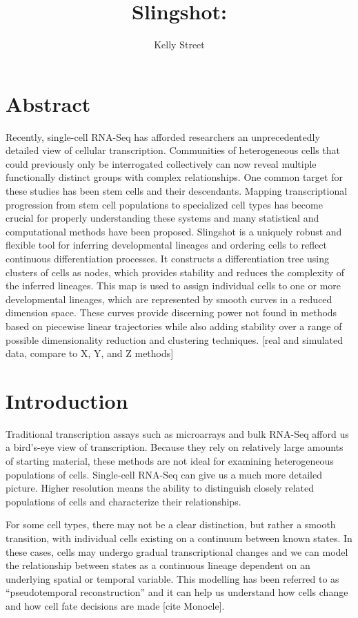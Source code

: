\documentclass[11pt]{article}\usepackage[]{graphicx}\usepackage[]{color}
\title{Slingshot: }
\author{Kelly Street}
\date{}
\begin{document}
\maketitle

\section{Abstract}
Recently, single-cell RNA-Seq has afforded researchers an unprecedentedly detailed view of cellular transcription. Communities of heterogeneous cells that could previously only be interrogated collectively can now reveal multiple functionally distinct groups with complex relationships. One common target for these studies has been stem cells and their descendants. Mapping transcriptional progression from stem cell populations to specialized cell types has become crucial for properly understanding these systems and many statistical and computational methods have been proposed. Slingshot is a uniquely robust and flexible tool for inferring developmental lineages and ordering cells to reflect continuous differentiation processes. It constructs a differentiation tree using clusters of cells as nodes, which provides stability and reduces the complexity of the inferred lineages. This map is used to assign individual cells to one or more developmental lineages, which are represented by smooth curves in a reduced dimension space. These curves provide discerning power not found in methods based on piecewise linear trajectories while also adding stability over a range of possible dimensionality reduction and clustering techniques. [real and simulated data, compare to X, Y, and Z methods]

\section{Introduction}

Traditional transcription assays such as microarrays and bulk RNA-Seq afford us a bird's-eye view of transcription. Because they rely on relatively large amounts of starting material, these methods are not ideal for examining heterogeneous populations of cells. Single-cell RNA-Seq can give us a much more detailed picture. Higher resolution means the ability to distinguish closely related populations of cells and characterize their relationships.

For some cell types, there may not be a clear distinction, but rather a smooth transition, with individual cells existing on a continuum between known states. In these cases, cells may undergo gradual transcriptional changes and we can model the relationship between states as a continuous lineage dependent on an underlying spatial or temporal variable. This modelling has been referred to as ``pseudotemporal reconstruction'' and it can help us understand how cells change and how cell fate decisions are made [cite Monocle].
\end{document}
